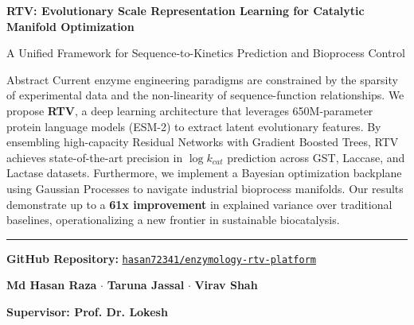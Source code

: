 \documentclass[11pt,a4paper,oneside]{article}
\begin{document}
\begin{titlepage}
    \centering
    \vspace*{3cm}
    
    
    \vspace{2cm}
    {\Huge \bfseries \color{AppleDark} RTV: Evolutionary Scale Representation Learning for Catalytic Manifold Optimization \par}
    \vspace{1cm}
    {\Large \color{gray} A Unified Framework for Sequence-to-Kinetics Prediction and Bioprocess Control \par}
    
    \vfill
    
    \begin{researchcard}{Abstract}
        Current enzyme engineering paradigms are constrained by the sparsity of experimental data and the non-linearity of sequence-function relationships. We propose \textbf{RTV}, a deep learning architecture that leverages 650M-parameter protein language models (ESM-2) to extract latent evolutionary features. By ensembling high-capacity Residual Networks with Gradient Boosted Trees, RTV achieves state-of-the-art precision in $\log k_{cat}$ prediction across GST, Laccase, and Lactase datasets. Furthermore, we implement a Bayesian optimization backplane using Gaussian Processes to navigate industrial bioprocess manifolds. Our results demonstrate up to a \textbf{61x improvement} in explained variance over traditional baselines, operationalizing a new frontier in sustainable biocatalysis.
        \vspace{0.4cm}
        \hrule
        \vspace{0.3cm}
        \centering
        \small \textbf{GitHub Repository:} \href{https://github.com/hasan72341/enzymology-rtv-platform}{\texttt{hasan72341/enzymology-rtv-platform}}
    \end{researchcard}
    
    \vfill
    {\large \textbf{Md Hasan Raza} $\cdot$ \textbf{Taruna Jassal} $\cdot$ \textbf{Virav Shah}\par}
    \vspace{0.5cm}
    {\large \textbf{Supervisor: Prof. Dr. Lokesh} \par}
    \vfill
\end{titlepage}
\end{document}
